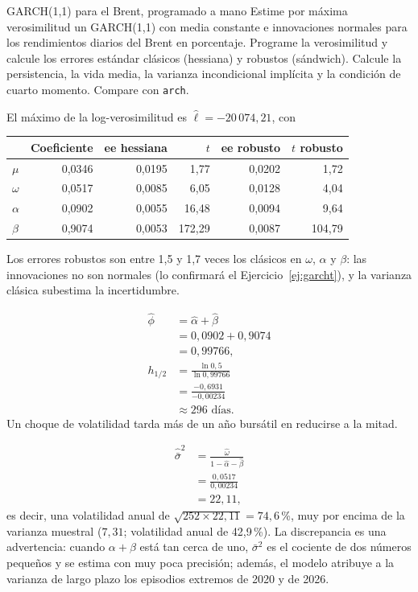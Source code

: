 \begin{ejresuelto}{GARCH(1,1) para el Brent, programado a mano}\label{ej:garchn}
\enunciado Estime por máxima verosimilitud un GARCH(1,1) con media constante e innovaciones normales para los
rendimientos diarios del Brent en porcentaje. Programe la verosimilitud y calcule los errores estándar clásicos
(hessiana) y robustos (sándwich). Calcule la persistencia, la vida media, la varianza incondicional implícita y
la condición de cuarto momento. Compare con \texttt{arch}.

\solucion
{} El máximo de la log-verosimilitud es $\hat\ell=-20\,074{,}21$, con
\begin{center}\small
\begin{tabular}{@{}lrrrrr@{}}
\toprule
 & Coeficiente & ee hessiana & $t$ & ee robusto & $t$ robusto \\
\midrule
$\mu$      & 0,0346 & 0,0195 & 1,77 & 0,0202 & 1,72 \\
$\omega$   & 0,0517 & 0,0085 & 6,05 & 0,0128 & 4,04 \\
$\alpha$   & 0,0902 & 0,0055 & 16,48 & 0,0094 & 9,64 \\
$\beta$    & 0,9074 & 0,0053 & 172,29 & 0,0087 & 104,79 \\
\bottomrule
\end{tabular}
\end{center}
Los errores robustos son entre 1,5 y 1,7 veces los clásicos en $\omega$, $\alpha$ y $\beta$: las innovaciones no
son normales (lo confirmará el Ejercicio~\ref{ej:garcht}), y la varianza clásica subestima la incertidumbre.

\begin{align*}
  \hat\phi &= \hat\alpha+\hat\beta\\
           &= 0{,}0902+0{,}9074\\
           &= 0{,}99766,\\[4pt]
  h_{1/2}  &= \frac{\ln0{,}5}{\ln0{,}99766}\\
           &= \frac{-0{,}6931}{-0{,}00234}\\
           &\approx 296 \text{ días}.
\end{align*}
Un choque de volatilidad tarda más de un año bursátil en reducirse a la mitad.

\begin{align*}
  \hat{\bar\sigma}^2 &= \frac{\hat\omega}{1-\hat\alpha-\hat\beta}\\
                     &= \frac{0{,}0517}{0{,}00234}\\
                     &= 22{,}11,
\end{align*}
es decir, una volatilidad anual de $\sqrt{252\times22{,}11}=74{,}6$\,\%, muy por encima de la varianza muestral
($7{,}31$; volatilidad anual de 42,9\,\%). La discrepancia es una advertencia: cuando $\alpha+\beta$ está tan
cerca de uno, $\bar\sigma^2$ es el cociente de dos números pequeños y se estima con muy poca precisión; además,
el modelo atribuye a la varianza de largo plazo los episodios extremos de 2020 y de 2026.


\end{ejresuelto}
